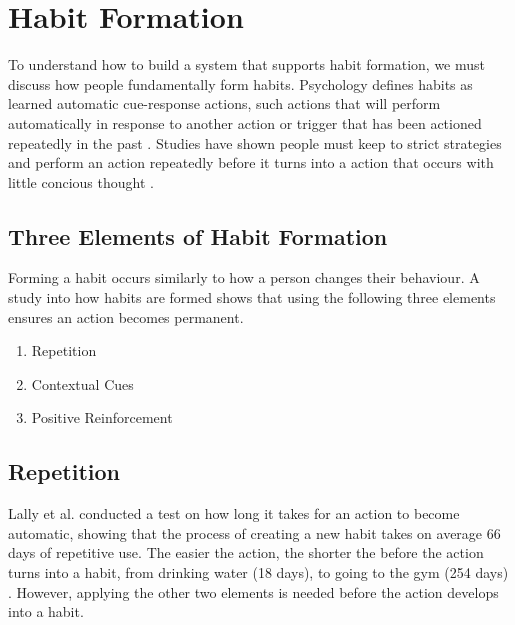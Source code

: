 \newpage

\section{Habit Formation}
To understand how to build a system that supports habit formation, we must discuss how people fundamentally form habits.\newline
\newline
Psychology defines habits as learned automatic cue-response actions, such actions that will perform automatically in response to another action or trigger that has been actioned repeatedly in the past \cite{article_the_habitual_consumer}. Studies have shown people must keep to strict strategies and perform an action repeatedly before it turns into a action that occurs with little concious thought \cite{article_promoting_habit_formation}.

\subsection{Three Elements of Habit Formation}
Forming a habit occurs similarly to how a person changes their behaviour. A study into how habits are formed \cite{article_experiences_of_habit_formation} shows that using the following three elements ensures an action becomes permanent.

\begin{enumerate}
  \item Repetition
  \item Contextual Cues
  \item Positive Reinforcement
\end{enumerate}

\subsection*{Repetition}
Lally et al. \cite{article_how_habits_formed_modelling_habit_formation} conducted a test on how long it takes for an action to become automatic, showing that the process of creating a new habit takes on average 66 days of repetitive use. The easier the action, the shorter the before the action turns into a habit, from drinking water (18 days), to going to the gym (254 days) \cite{article_how_habits_formed_modelling_habit_formation}. However, applying the other two elements is needed before the action develops into a habit.

